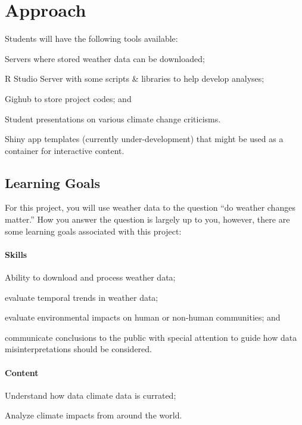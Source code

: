 \documentclass{article}\usepackage[]{graphicx}\usepackage[]{color}
\newenvironment{itemize*}%
  {\begin{itemize}%
    \setlength{\itemsep}{0pt}%
    \setlength{\parskip}{0pt}}%
  {\end{itemize}}
\begin{document}
\section{Approach}

Students will have the following tools available:

\begin{itemize*}
  \item Servers where stored weather data can be downloaded;
  \item R Studio Server with some scripts \& libraries to help develop analyses;
  \item Gighub to store project codes; and
  \item Student presentations on various climate change criticisms. 
  \item Shiny app templates (currently under-development) that might be used as a container for interactive content.
\end{itemize*}

\subsection{Learning Goals}

For this project, you will use weather data to the question ``do weather changes matter.'' How you answer the question is largely up to you, however, there are some learning goals associated with this project:

\paragraph{Skills}

\begin{itemize*}
  \item Ability to download and process weather data;
  \item evaluate temporal trends in weather data;
  \item evaluate environmental impacts on human or non-human communities; and
  \item communicate conclusions to the public with special attention to guide how data misinterpretations should be considered.
\end{itemize*}

\paragraph{Content}
\begin{itemize*}
  \item Understand how data climate data is currated;
  \item Analyze climate impacts from around the world.
\end{itemize*}
\end{document}
